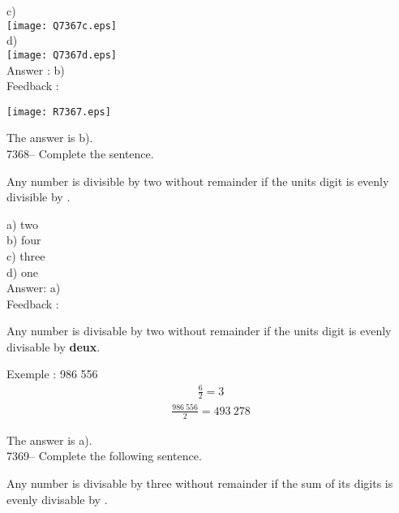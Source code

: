 \documentclass[letterpaper, 12pt]{article}
\begin{document}
c)\\
\texttt{[image: Q7367c.eps]}
\\

d)\\
\texttt{[image: Q7367d.eps]}
\\

Answer : b)\\

Feedback :\\
\begin{center}
\texttt{[image: R7367.eps]}
\end{center}
The answer is b).\\

7368-- Complete the sentence.
\begin{center}
Any number is divisible by two without remainder if the units digit is evenly divisible by \underline{\quad\quad}.\\
\end{center}
 
a) two\\
b) four\\
c) three\\
d) one\\

Answer: a)\\

Feedback : \\
\begin{center}
Any number is divisable by two without remainder if the units 
digit is evenly divisable by \textbf{deux}.\\
\end{center}

Exemple : 986 556\\
\begin{eqnarray*}
\frac{6}{2}= 3
\end{eqnarray*}
\begin{eqnarray*}
\frac{986\ 556}{2}= 493\ 278
\end{eqnarray*}


The answer is a).\\

7369-- Complete the following sentence.
\begin{center}
Any number is divisable by three without remainder if the sum of its digits is evenly divisable by \underline{\quad\quad}.\\
\end{center}
\end{document}

